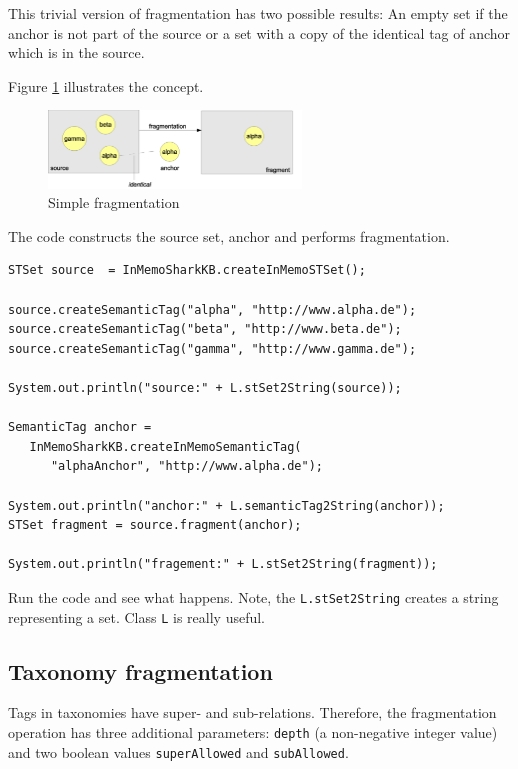 This trivial version of fragmentation has two possible results: An empty set if the anchor is not part of the source or a set with a copy of the identical tag of anchor which is in the source.

Figure \ref{fig:simpleFragmentation} illustrates the concept.

\begin{figure}[t]
\centering
\includegraphics[width=0.60\textwidth]{simpleFragmentation.eps}
\caption{Simple fragmentation}
\label{fig:simpleFragmentation}
\end{figure}

The code constructs the source set, anchor and performs fragmentation.

\begin{verbatim}
STSet source  = InMemoSharkKB.createInMemoSTSet();

source.createSemanticTag("alpha", "http://www.alpha.de");
source.createSemanticTag("beta", "http://www.beta.de");
source.createSemanticTag("gamma", "http://www.gamma.de");

System.out.println("source:" + L.stSet2String(source));

SemanticTag anchor = 
   InMemoSharkKB.createInMemoSemanticTag(
      "alphaAnchor", "http://www.alpha.de");

System.out.println("anchor:" + L.semanticTag2String(anchor));
STSet fragment = source.fragment(anchor);

System.out.println("fragement:" + L.stSet2String(fragment));
\end{verbatim}

Run the code and see what happens. Note, the {\tt L.stSet2String} creates a string representing a set. Class {\tt L} is really useful.

\subsection{Taxonomy fragmentation}
\label{sec:taxonomyFragmentation}
Tags in taxonomies have super- and sub-relations. Therefore, the fragmentation operation has three additional parameters: {\tt depth} (a non-negative integer value) and two boolean values {\tt superAllowed} and {\tt subAllowed}.

